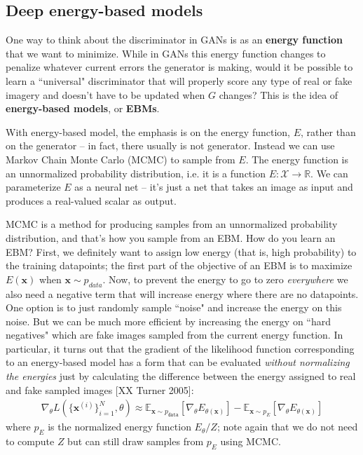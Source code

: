 \subsection{Deep energy-based models}
One way to think about the discriminator in GANs is as an {\bf energy function} that we want to minimize. While in GANs this energy function changes to penalize whatever current errors the generator is making, would it be possible to learn a ``universal" discriminator that will properly score any type of real or fake imagery and doesn't have to be updated when $G$ changes? This is the idea of {\bf energy-based models}, or {\bf EBMs}.

With energy-based model, the emphasis is on the energy function, $E$, rather than on the generator -- in fact, there usually is not generator. Instead we can use Markov Chain Monte Carlo (MCMC) to sample from $E$. The energy function is an unnormalized probability distribution, i.e. it is a function $E: \mathcal{X} \rightarrow \mathbb{R}$. We can parameterize $E$ as a neural net -- it's just a net that takes an image as input and produces a real-valued scalar as output.

MCMC is a method for producing samples from an unnormalized probability distribution, and that's how you sample from an EBM. How do you learn an EBM? First, we definitely want to assign low energy (that is, high probability) to the training datapoints; the first part of the objective of an EBM is to maximize $E(\mathbf{x})$ when $\mathbf{x} \sim p_{data}$. Now, to prevent the energy to go to zero \textit{everywhere} we also need a negative term that will increase energy where there are no datapoints. One option is to just randomly sample ``noise" and increase the energy on this noise. But we can be much more efficient by increasing the energy on ``hard negatives" which are fake images sampled from the current energy function. In particular, it turns out that the gradient of the likelihood function corresponding to an energy-based model has a form that can be evaluated \textit{without normalizing the energies} just by calculating the difference between the energy assigned to real and fake sampled images [XX Turner 2005]:
\begin{align}
    \nabla_{\theta}L(\{\mathbf{x}^{(i)}\}_{i=1}^N, \theta) \approx \mathbb{E}_{\mathbf{x} \sim p_{\texttt{data}}}[\nabla_{\theta}E_{\theta(\mathbf{x})}] - \mathbb{E}_{\mathbf{x} \sim p_{E}}[\nabla_{\theta}E_{\theta(\mathbf{x})}]
\end{align}
where $p_{E}$ is the normalized energy function $E_{\theta}/Z$; note again that we do not need to compute $Z$ but can still draw samples from $p_{E}$ using MCMC.

